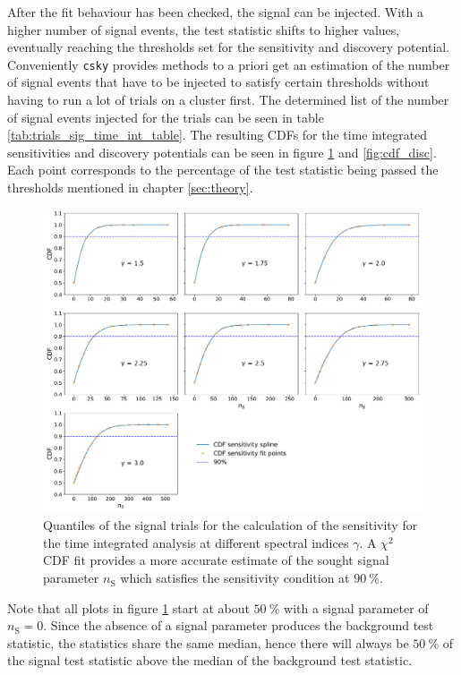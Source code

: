 After the fit behaviour has been checked, the signal can be injected.
With a higher number of signal events, the test statistic shifts to higher values, eventually reaching the thresholds set for the sensitivity and discovery potential.
Conveniently \texttt{csky} provides methods to a priori get an estimation of the number of signal events that have to be injected to satisfy certain thresholds without having to run a lot of trials on a cluster first.
The determined list of the number of signal events injected for the trials can be seen in table \ref{tab:trials_sig_time_int_table}.
The resulting CDFs for the time integrated sensitivities and discovery potentials can be seen in figure \ref{fig:cdf_sens} and \ref{fig:cdf_disc}.
Each point corresponds to the percentage of the test statistic being passed the thresholds mentioned in chapter \ref{sec:theory}.
\begin{figure}
    \centering
    \includegraphics[width=\linewidth]{Plots/05_csky/9_years_gfu_gold_cdf_sens.pdf}
    \caption{Quantiles of the signal trials for the calculation of the sensitivity for the time integrated analysis at different spectral indices $\gamma$. A $\chi^2$ CDF fit provides a more accurate estimate of the sought signal parameter $n_\text{S}$ which satisfies the sensitivity condition at $\SI{90}{\percent}$.}
    \label{fig:cdf_sens}
\end{figure}
Note that all plots in figure \ref{fig:cdf_sens} start at about $\SI{50}{\percent}$ with a signal parameter of $n_\text{S} = 0$.
Since the absence of a signal parameter produces the background test statistic, the statistics share the same median, hence there will always be $\SI{50}{\percent}$ of the signal test statistic above the median of the background test statistic.
